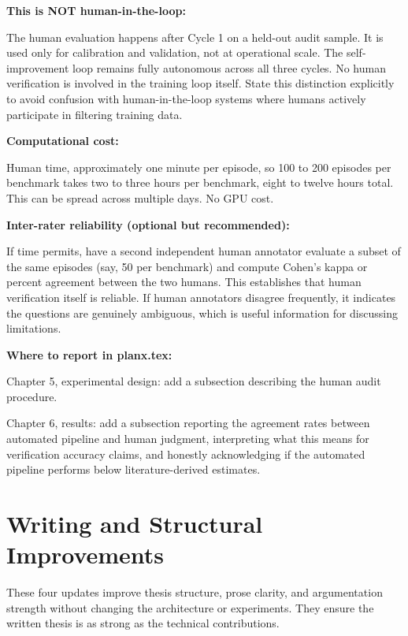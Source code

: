 \documentclass[11pt,a4paper]{article}
\begin{document}
{\textbf{This is NOT human-in-the-loop:}

The human evaluation happens after Cycle 1 on a held-out audit sample. It is used only for calibration and validation, not at operational scale. The self-improvement loop remains fully autonomous across all three cycles. No human verification is involved in the training loop itself. State this distinction explicitly to avoid confusion with human-in-the-loop systems where humans actively participate in filtering training data.

\textbf{Computational cost:}

Human time, approximately one minute per episode, so 100 to 200 episodes per benchmark takes two to three hours per benchmark, eight to twelve hours total. This can be spread across multiple days. No GPU cost.

\textbf{Inter-rater reliability (optional but recommended):}

If time permits, have a second independent human annotator evaluate a subset of the same episodes (say, 50 per benchmark) and compute Cohen's kappa or percent agreement between the two humans. This establishes that human verification itself is reliable. If human annotators disagree frequently, it indicates the questions are genuinely ambiguous, which is useful information for discussing limitations.

\textbf{Where to report in planx.tex:}

Chapter 5, experimental design: add a subsection describing the human audit procedure.

Chapter 6, results: add a subsection reporting the agreement rates between automated pipeline and human judgment, interpreting what this means for verification accuracy claims, and honestly acknowledging if the automated pipeline performs below literature-derived estimates.
}

\newpage

\section{Writing and Structural Improvements}
\label{sec:writing}

These four updates improve thesis structure, prose clarity, and argumentation strength without changing the architecture or experiments. They ensure the written thesis is as strong as the technical contributions.
\end{document}
